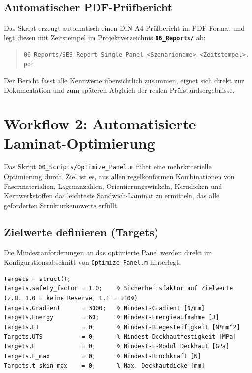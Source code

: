 \subsection*{Automatischer PDF-Prüfbericht}
Das Skript erzeugt automatisch einen DIN-A4-Prüfbericht im \hyperref[abk:PDF]{PDF}-Format und legt diesen mit Zeitstempel im Projektverzeichnis \textbf{\texttt{06\_Reports/}} ab:
\begin{quote}
    \texttt{06\_Reports/SES\_Report\_Single\_Panel\_<Szenarioname>\_<Zeitstempel>.pdf}
\end{quote}
Der Bericht fasst alle Kennwerte übersichtlich zusammen, eignet sich direkt zur Dokumentation und zum späteren Abgleich der realen Prüfstandsergebnisse.

\clearpage

\section{Workflow 2: Automatisierte Laminat-Optimierung} \label{sec:optimize_panel}

Das Skript \texttt{00\_Scripts/Optimize\_Panel.m} führt eine mehrkriterielle Optimierung durch. Ziel ist es, aus allen regelkonformen Kombinationen von Fasermaterialien, Lagenanzahlen, Orientierungswinkeln, Kerndicken und Kernwerkstoffen das leichteste Sandwich-Laminat zu ermitteln, das alle geforderten Strukturkennwerte erfüllt.

\subsection*{Zielwerte definieren (Targets)}
Die Mindestanforderungen an das optimierte Panel werden direkt im Konfigurationsabschnitt von \texttt{Optimize\_Panel.m} hinterlegt:

\begin{lstlisting}[style=vscodeLightMatlab]
Targets = struct();
Targets.safety_factor = 1.0;    % Sicherheitsfaktor auf Zielwerte (z.B. 1.0 = keine Reserve, 1.1 = +10%)
Targets.Gradient      = 3000;   % Mindest-Gradient [N/mm]
Targets.Energy        = 60;     % Mindest-Energieaufnahme [J]
Targets.EI            = 0;      % Mindest-Biegesteifigkeit [N*mm^2]
Targets.UTS           = 0;      % Mindest-Deckhautfestigkeit [MPa]
Targets.E             = 0;      % Mindest-E-Modul Deckhaut [GPa]
Targets.F_max         = 0;      % Mindest-Bruchkraft [N]
Targets.t_skin_max    = 0;      % Max. Deckhautdicke [mm]
\end{lstlisting}

